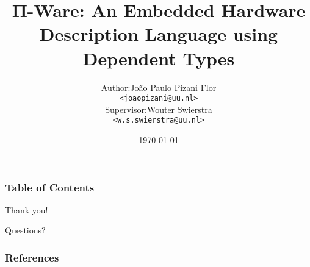\documentclass{beamer}
\title[PiWare]{Π-Ware: An Embedded Hardware Description Language using Dependent Types}
\date{\today}
\institute[Utrecht University] {
    Department of Information and Computing Sciences \\
    Utrecht University
}
\begin{document}
    \author[J. P. Pizani Flor]{
        \begin{tabular}{r@{ }l}
            Author:     & João Paulo Pizani Flor \\
                        & \small{\texttt{<joaopizani@uu.nl>}} \\[2ex]
            Supervisor: & Wouter Swierstra \\
                        & \small{\texttt{<w.s.swierstra@uu.nl>}}
        \end{tabular}
    }


    \begin{frame}
        \titlepage
    \end{frame}

    \begin{frame}
        \frametitle{Table of Contents}
        \tableofcontents
    \end{frame}


    
    
    
    


    \begin{frame}[plain]
        \begin{center}
            \par{\Huge{Thank you!}}
            \vspace{2.0cm}
            \par{\Huge{Questions?}}
        \end{center}
    \end{frame}

    \begin{frame}[allowframebreaks]
        \frametitle{References}
        
        
    \end{frame}
\end{document}
